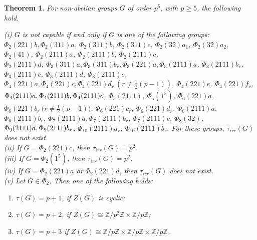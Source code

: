 \documentclass[a4paper,11pt]{amsart}
\numberwithin{equation}{section}
\numberwithin{equation}{subsection}
\newtheorem{theorem}{Theorem}[section]
\newcommand{\Z}{\mathbb{Z}}
\newcommand{\ti}{\tau_{irr}(G)}
\begin{document}
\begin{theorem} \label{p5}
For non-abelian groups $G$ of order $p^5$, with $p \geq 5$, the following hold. 

(i) $G$ is not capable if and only if $G$ is one of the following groups: $\Phi_{2}(221)b, \Phi_{2}(311)a$, $ \Phi_{2}(311)b$, $\Phi_{2}(311)c$, $\Phi_{2}(32)a_1$, $\Phi_{2}(32)a_2$, $\Phi_{2}(41)$, $\Phi_{2}(2111)a$, $\Phi_{2}(2111)b$, $\Phi_{2}(2111)c$, \\ $\Phi_{2}(2111)d$, $\Phi_{3}(311)a, \Phi_{3}(311)b_r, \Phi_{3}(221)a, \Phi_{3}(2111)a$, $ \Phi_{3}(2111)b_r$, $\Phi_{3}(2111)c$, $\Phi_{3}(2111)d$, $\Phi_{3}(2111)e$, $\Phi_{4}(221)a, \Phi_{4}(221)c, \Phi_{4}(221)d_r \ (r \neq \tfrac{1}{2}(p-1))$, $\Phi_{4}(221)e$, $\Phi_{4}(221)f_r$, $\Phi_{4}(2111)a, \\ \Phi_{4}(2111)b, \Phi_{4}(2111)c$, $\Phi_{5}(2111)$, $\Phi_{5}(1^5)$, $\Phi_{6}(221)a$, $\Phi_{6}(221)b_r \ \big(r \neq \tfrac{1}{2}(p-1)\big)$, $\Phi_{6}(221)c_r$, $\Phi_{6}(221)d_r$, $\Phi_{6}(2111)a$, $\Phi_{6}(2111)b_r$, $\Phi_{7}(2111)a, \Phi_{7}(2111)b_r$, $\Phi_{7}(2111)c$, $\Phi_8(32)$, $\Phi_{9}(2111)a, \\ \Phi_{9}(2111)b_r$, $\Phi_{10}(2111)a_r$, $\Phi_{10}(2111)b_r$. 
For these groups, $\tau_{irr}(G)$ does not exist. \\



(ii) If $G = \Phi_{2}(221)c$, then $\ti = p^2$. \\

(iii) If $G = \Phi_{2}(1^5)$, then $\ti = p^2$. \\

(iv) If $G= \Phi_{2}(221)a$ or $\Phi_{2}(221)d$, then $\ti$ does not exist.   \\ 

(v) Let $G \in \Phi_{2}$. Then one of the following holds:
\begin{enumerate}[label=(\alph*)]
	\item $\tau(G) = p+1$, if $Z(G)$ is cyclic;
	\item $\tau(G) = p+2$, if $Z(G) \cong \Z/p^{2}\Z \times \Z/p\Z$;
	\item $\tau(G) = p+3$ if $Z(G) \cong \Z/p\Z \times \Z/p\Z \times \Z/p\Z$. 
	\\
\end{enumerate}


\end{theorem}
\end{document}
